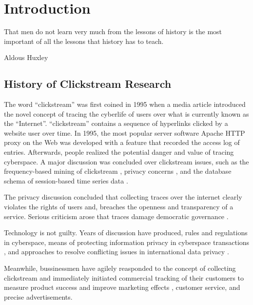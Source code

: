 \section{Introduction}
\label{ch:intro}

\epigraph{That men do not learn very much from the lessons of history is the most important of all the lessons that history has to teach.}{Aldous Huxley}

\subsection{History of Clickstream Research}

The word ``clickstream'' \cite{friedman1995} was first coined in 1995 when a media 
article introduced the novel concept of tracing the cyberlife of users over what is currently known
as the ``Internet''. ``clickstream'' contains a sequence of hyperlinks clicked by a 
website user over time. In 1995, the most popular server software 
Apache HTTP \cite{apache1995http} proxy on the Web was developed with a feature that 
recorded the access log of entries. Afterwards, people realized the potential danger and value 
of tracing cyberspace. A major discussion was concluded over clickstream issues, such as 
the frequency-based mining of clickstream \cite{brodwin1995}, privacy concerns
\cite{reidenberg1996governing}, and the database schema of session-based time series data 
\cite{courtheoux2000database}.

The privacy discussion concluded that collecting traces over the internet clearly violates 
the rights of users and,
breaches the openness and transparency of a service.
Serious criticism arose that traces damage democratic governance \cite{gindin1997lost}.

Technology is not guilty. Years of discussion have produced, rules 
\cite{reidenberg1996governing} and regulations \cite{skok1999establishing} in cyberspace,
means of protecting information privacy in cyberspace transactions \cite{kang1997information},
and approaches to resolve conflicting issues in international data privacy \cite{reidenberg1999resolving}.

Meanwhile, bussinessmen have agilely reasponded to the concept of collecting clickstream 
and immediately initiated commercial tracking of their customers to measure product success \cite{schonberg2000measuring}
and improve marketing effects \cite{novick1995}, customer service, and precise advertisements\cite{reagle1999platform, bucklin2000sticky}.

